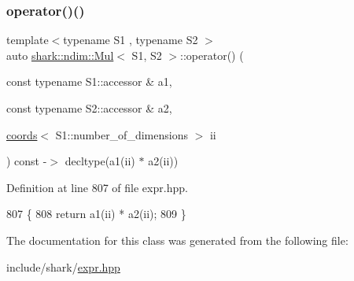 \subsubsection{\texorpdfstring{operator()()}{operator()()}}
{\footnotesize\ttfamily template$<$typename S1 , typename S2 $>$ \\
auto \hyperlink{classshark_1_1ndim_1_1_mul}{shark\+::ndim\+::\+Mul}$<$ S1, S2 $>$\+::operator() (\begin{DoxyParamCaption}\item[{const typename S1\+::accessor \&}]{a1,  }\item[{const typename S2\+::accessor \&}]{a2,  }\item[{\hyperlink{structshark_1_1ndim_1_1coords}{coords}$<$ S1\+::number\+\_\+of\+\_\+dimensions $>$}]{ii }\end{DoxyParamCaption}) const -\/$>$ decltype(a1(ii) $\ast$ a2(ii)) \hspace{0.3cm}{\ttfamily [inline]}}



Definition at line 807 of file expr.\+hpp.


\begin{DoxyCode}
807                                                                                                            
                                                           \{
808                 \textcolor{keywordflow}{return} a1(ii) * a2(ii);
809             \}
\end{DoxyCode}


The documentation for this class was generated from the following file\+:\begin{DoxyCompactItemize}
\item 
include/shark/\hyperlink{expr_8hpp}{expr.\+hpp}\end{DoxyCompactItemize}
